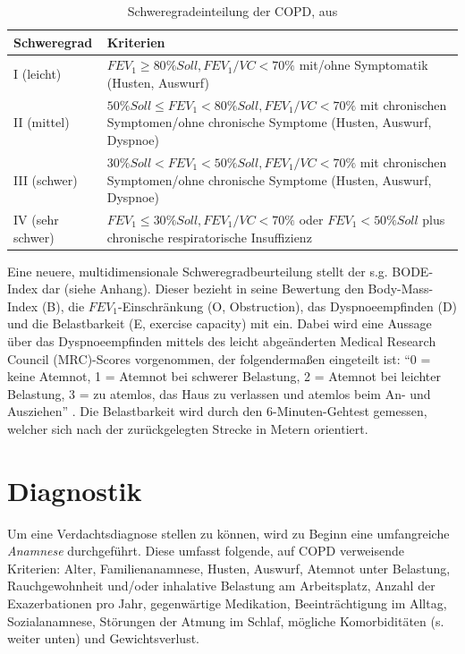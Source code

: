 \begin{table}
\centering
\begin{tabular}{lp{10cm}}
	\textbf{Schweregrad} & \textbf{Kriterien} \\
	\hline \hline
	I (leicht) & $FEV_{1} \ge 80\% Soll, FEV_{1}/VC < 70\%$ \newline mit/ohne Symptomatik (Husten, Auswurf) \\
	\hline
	II (mittel) & $50\% Soll \le FEV_{1} < 80\% Soll, FEV_{1}/VC < 70\%$ \newline mit chronischen Symptomen/ohne chronische Symptome (Husten, Auswurf, Dyspnoe) \\
	\hline
	III (schwer) & $30\% Soll < FEV_{1} < 50\% Soll, FEV_{1}/VC < 70\%$ \newline mit chronischen Symptomen/ohne chronische Symptome (Husten, Auswurf, Dyspnoe) \\
	\hline
	IV (sehr schwer) & $FEV_{1} \le 30\% Soll, FEV_{1}/VC < 70\%$ oder \newline $FEV_{1} < 50\% Soll$ plus chronische respiratorische Insuffizienz \\
	\hline
\end{tabular}
\caption{Schweregradeinteilung der COPD, aus \autocite[e9]{vogelmeier2007}}
\label{tab:copd_schweregrade}
\end{table}

Eine neuere, multidimensionale Schweregradbeurteilung stellt der s.g. BODE-Index dar (siehe Anhang). Dieser bezieht in seine Bewertung den Body-Mass-Index (B), die $FEV_{1}$-Einschränkung (O, Obstruction), das Dyspnoeempfinden (D) und die Belastbarkeit (E, exercise capacity) mit ein. Dabei wird eine Aussage über das Dyspnoeempfinden mittels des leicht abgeänderten Medical Research Council (MRC)-Scores vorgenommen, der folgendermaßen eingeteilt ist: "`0 = keine Atemnot, 1 = Atemnot bei schwerer Belastung, 2 = Atemnot bei leichter Belastung, 3 = zu atemlos, das Haus zu verlassen und atemlos beim An- und Ausziehen"' \autocite[186f.]{welte2007}. Die Belastbarkeit wird durch den 6-Minuten-Gehtest gemessen, welcher sich nach der zurückgelegten Strecke in Metern orientiert.


\section{Diagnostik} %
\label{diagnostik}
Um eine Verdachtsdiagnose stellen zu können, wird zu Beginn eine umfangreiche \emph{Anamnese} durchgeführt. Diese umfasst folgende, auf COPD verweisende Kriterien: Alter, Familienanamnese, Husten, Auswurf, Atemnot unter Belastung, Rauchgewohnheit und/oder inhalative Belastung am Arbeitsplatz, Anzahl der Exazerbationen pro Jahr, gegenwärtige Medikation, Beeinträchtigung im Alltag, Sozialanamnese, Störungen der Atmung im Schlaf, mögliche Komorbiditäten (s. weiter unten) und Gewichtsverlust. 

